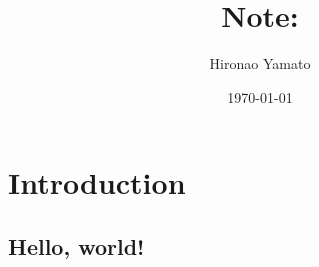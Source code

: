 \documentclass[aps, 12pt]{revtex4-2}
\begin{document}
\title{Note: }
\author{Hironao Yamato}
\date{\today}
\maketitle

\section{Introduction}
\subsection{Hello, world!}


\end{document}
